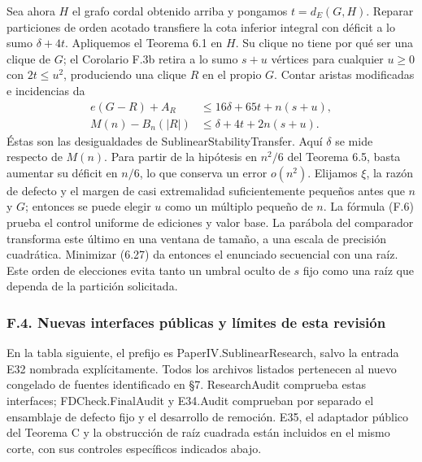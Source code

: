 \documentclass[spanish,11pt,a4paper]{article}
\begin{document}
Sea ahora \(H\) el grafo cordal obtenido arriba y pongamos \(t=d_E(G,H)\). Reparar particiones de orden acotado transfiere la cota inferior integral con déficit a lo sumo \(\delta+4t\). Apliquemos el Teorema 6.1 en \(H\). Su clique no tiene por qué ser una clique de \(G\); el Corolario F.3b retira a lo sumo \(s+u\) vértices para cualquier \(u\ge0\) con \(2t\le u^2\), produciendo una clique \(R\) en el propio \(G\). Contar aristas modificadas e incidencias da \[
\begin{aligned}
e(G-R)+A_R&\le16\delta+65t+n(s+u),\\
M(n)-B_n(|R|)&\le\delta+4t+2n(s+u).
\end{aligned}
\tag{F.6}
\] Éstas son las desigualdades de {\ttfamily\small SublinearSta\discretionary{\hbox{\ensuremath{\hookrightarrow}}}{}{}bilityTransf\discretionary{\hbox{\ensuremath{\hookrightarrow}}}{}{}er}. Aquí \(\delta\) se mide respecto de \(M(n)\). Para partir de la hipótesis en \(n^2/6\) del Teorema 6.5, basta aumentar su déficit en \(n/6\), lo que conserva un error \(o(n^2)\). Elijamos \(\xi\), la razón de defecto y el margen de casi extremalidad suficientemente pequeños antes que \(n\) y \(G\); entonces se puede elegir \(u\) como un múltiplo pequeño de \(n\). La fórmula (F.6) prueba el control uniforme de ediciones y valor base. La parábola del comparador transforma este último en una ventana de tamaño, a una escala de precisión cuadrática. Minimizar (6.27) da entonces el enunciado secuencial con una raíz. Este orden de elecciones evita tanto un umbral oculto de \(s\) fijo como una raíz que dependa de la partición solicitada.

\subsubsection{F.4. Nuevas interfaces públicas y límites de esta revisión}\label{f.4.-nuevas-interfaces-publicas-y-limites-de-esta-revision}

En la tabla siguiente, el prefijo es {\ttfamily\small PaperIV.\discretionary{\hbox{\ensuremath{\hookrightarrow}}}{}{}SublinearRes\discretionary{\hbox{\ensuremath{\hookrightarrow}}}{}{}earch}, salvo la entrada E32 nombrada explícitamente. Todos los archivos listados pertenecen al nuevo congelado de fuentes identificado en §7. {\ttfamily\small ResearchAudi\discretionary{\hbox{\ensuremath{\hookrightarrow}}}{}{}t} comprueba estas interfaces; {\ttfamily\small FDCheck.\discretionary{\hbox{\ensuremath{\hookrightarrow}}}{}{}FinalAudit} y {\ttfamily\small E34.\discretionary{\hbox{\ensuremath{\hookrightarrow}}}{}{}Audit} comprueban por separado el ensamblaje de defecto fijo y el desarrollo de remoción. E35, el adaptador público del Teorema C y la obstrucción de raíz cuadrada están incluidos en el mismo corte, con sus controles específicos indicados abajo.
\end{document}
